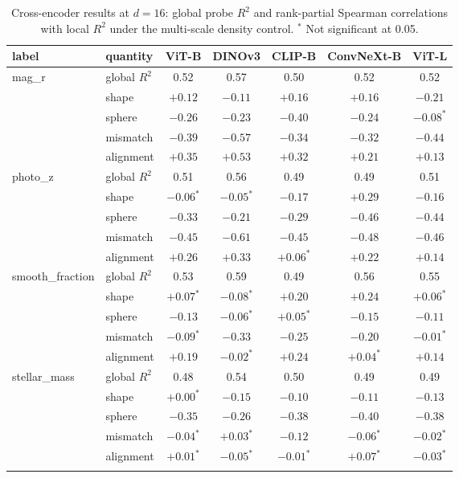 \documentclass{article}
\begin{document}
\begin{table}[h]
\centering
\footnotesize
\setlength{\tabcolsep}{4pt}
\begin{tabular}{llccccc}
\toprule
label & quantity & ViT-B & DINOv3 & CLIP-B & ConvNeXt-B & ViT-L \\
\midrule
mag\_r & global $R^2$ & 0.52 & 0.57 & 0.50 & 0.52 & 0.52 \\
 & shape & $+0.12$ & $-0.11$ & $+0.16$ & $+0.16$ & $-0.21$ \\
 & sphere & $-0.26$ & $-0.23$ & $-0.40$ & $-0.24$ & $-0.08^{*}$ \\
 & mismatch & $-0.39$ & $-0.57$ & $-0.34$ & $-0.32$ & $-0.44$ \\
 & alignment & $+0.35$ & $+0.53$ & $+0.32$ & $+0.21$ & $+0.13$ \\
\addlinespace[2pt]
photo\_z & global $R^2$ & 0.51 & 0.56 & 0.49 & 0.49 & 0.51 \\
 & shape & $-0.06^{*}$ & $-0.05^{*}$ & $-0.17$ & $+0.29$ & $-0.16$ \\
 & sphere & $-0.33$ & $-0.21$ & $-0.29$ & $-0.46$ & $-0.44$ \\
 & mismatch & $-0.45$ & $-0.61$ & $-0.45$ & $-0.48$ & $-0.46$ \\
 & alignment & $+0.26$ & $+0.33$ & $+0.06^{*}$ & $+0.22$ & $+0.14$ \\
\addlinespace[2pt]
smooth\_fraction & global $R^2$ & 0.53 & 0.59 & 0.49 & 0.56 & 0.55 \\
 & shape & $+0.07^{*}$ & $-0.08^{*}$ & $+0.20$ & $+0.24$ & $+0.06^{*}$ \\
 & sphere & $-0.13$ & $-0.06^{*}$ & $+0.05^{*}$ & $-0.15$ & $-0.11$ \\
 & mismatch & $-0.09^{*}$ & $-0.33$ & $-0.25$ & $-0.20$ & $-0.01^{*}$ \\
 & alignment & $+0.19$ & $-0.02^{*}$ & $+0.24$ & $+0.04^{*}$ & $+0.14$ \\
\addlinespace[2pt]
stellar\_mass & global $R^2$ & 0.48 & 0.54 & 0.50 & 0.49 & 0.49 \\
 & shape & $+0.00^{*}$ & $-0.15$ & $-0.10$ & $-0.11$ & $-0.13$ \\
 & sphere & $-0.35$ & $-0.26$ & $-0.38$ & $-0.40$ & $-0.38$ \\
 & mismatch & $-0.04^{*}$ & $+0.03^{*}$ & $-0.12$ & $-0.06^{*}$ & $-0.02^{*}$ \\
 & alignment & $+0.01^{*}$ & $-0.05^{*}$ & $-0.01^{*}$ & $+0.07^{*}$ & $-0.03^{*}$ \\
\addlinespace[2pt]
\bottomrule
\end{tabular}
\caption{Cross-encoder results at $d=16$:
global probe $R^2$ and rank-partial Spearman
correlations with local $R^2$ under the
multi-scale density control.
$^{*}$ Not significant at 0.05.}
\label{tab:xenc}
\end{table}
\end{document}
